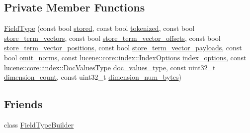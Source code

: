 \subsection*{Private Member Functions}
\begin{DoxyCompactItemize}
\item 
\mbox{\hyperlink{classlucene_1_1core_1_1document_1_1FieldType_ac1f2724c5c5cfc63b7c29021d3524c12}{Field\+Type}} (const bool \mbox{\hyperlink{classlucene_1_1core_1_1document_1_1FieldType_a56b81575dbaea749036201c379034cc8}{stored}}, const bool \mbox{\hyperlink{classlucene_1_1core_1_1document_1_1FieldType_abe04c4af1aafbe73f3e1a0333f08cfd8}{tokenized}}, const bool \mbox{\hyperlink{classlucene_1_1core_1_1document_1_1FieldType_af8c77a78e7e5749cbff0044ad5bc94b1}{store\+\_\+term\+\_\+vectors}}, const bool \mbox{\hyperlink{classlucene_1_1core_1_1document_1_1FieldType_a8aae5a6917e9d3d02c00966df5169504}{store\+\_\+term\+\_\+vector\+\_\+offsets}}, const bool \mbox{\hyperlink{classlucene_1_1core_1_1document_1_1FieldType_a0c763a29f6d5b3c9b29b585935332f90}{store\+\_\+term\+\_\+vector\+\_\+positions}}, const bool \mbox{\hyperlink{classlucene_1_1core_1_1document_1_1FieldType_a7e6c868f2767a9045f55239448eb56fa}{store\+\_\+term\+\_\+vector\+\_\+payloads}}, const bool \mbox{\hyperlink{classlucene_1_1core_1_1document_1_1FieldType_a608b14ab36f164f6fc88fc47401dfdd8}{omit\+\_\+norms}}, const \mbox{\hyperlink{namespacelucene_1_1core_1_1index_a0d5e1f98471a76de106056cf3b5a7897}{lucene\+::core\+::index\+::\+Index\+Options}} \mbox{\hyperlink{classlucene_1_1core_1_1document_1_1FieldType_ace77c2df2db83441226f4c72e7455910}{index\+\_\+options}}, const \mbox{\hyperlink{namespacelucene_1_1core_1_1index_a2f7ffaef6429b5df542c8aa12f8b9883}{lucene\+::core\+::index\+::\+Doc\+Values\+Type}} \mbox{\hyperlink{classlucene_1_1core_1_1document_1_1FieldType_ac90952580a0964ee3ca3c9a8c6fe65a9}{doc\+\_\+values\+\_\+type}}, const uint32\+\_\+t \mbox{\hyperlink{classlucene_1_1core_1_1document_1_1FieldType_a86df8398e9e9765cda2d2e48c2ec8cce}{dimension\+\_\+count}}, const uint32\+\_\+t \mbox{\hyperlink{classlucene_1_1core_1_1document_1_1FieldType_a66764229077763f23d13537795f7efe3}{dimension\+\_\+num\+\_\+bytes}})
\end{DoxyCompactItemize}
\subsection*{Friends}
\begin{DoxyCompactItemize}
\item 
class \mbox{\hyperlink{classlucene_1_1core_1_1document_1_1FieldType_a3fb44009cf30f7bfb252cc034982cbad}{Field\+Type\+Builder}}
\end{DoxyCompactItemize}


